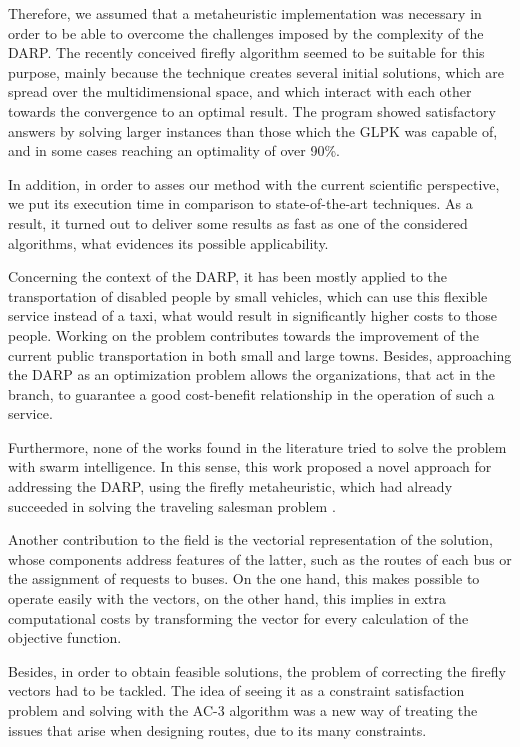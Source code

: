 \documentclass[tuberlin,cic,tc,openright,english,noabntcite,oneside]{iiufrgs}
\begin{document}
Therefore, we assumed that a metaheuristic implementation was necessary in order to be able to overcome the challenges imposed by the complexity of the DARP. The recently conceived firefly algorithm seemed to be suitable for this purpose, mainly because the technique creates several initial solutions, which are spread over the multidimensional space, and which interact with each other towards the convergence to an optimal result. The program showed satisfactory answers by solving larger instances than those which the GLPK was capable of, and in some cases reaching an optimality of over 90\%.

In addition, in order to asses our method with the current scientific perspective, we put its execution time in comparison to state-of-the-art techniques. As a result, it turned out to deliver some results as fast as one of the considered algorithms, what evidences its possible applicability.

Concerning the context of the DARP, it has been mostly applied to the transportation of disabled people by small vehicles, which can use this flexible service instead of a taxi, what would result in significantly higher costs to those people. Working on the problem contributes towards the improvement of the current public transportation in both small and large towns. Besides, approaching the DARP as an optimization problem allows the organizations, that act in the branch, to guarantee a good cost-benefit relationship in the operation of such a service.

Furthermore, none of the works found in the literature tried to solve the problem with swarm intelligence. In this sense, this work proposed a novel approach for addressing the DARP, using the firefly metaheuristic, which had already succeeded in solving the traveling salesman problem \parencite{jati_evolutionary_2011}.

Another contribution to the field is the vectorial representation of the solution, whose components address features of the latter, such as the routes of each bus or the assignment of requests to buses. On the one hand, this makes possible to operate easily with the vectors, on the other hand, this implies in extra computational costs by transforming the vector for every calculation of the objective function.

Besides, in order to obtain feasible solutions, the problem of correcting the firefly vectors had to be tackled. The idea of seeing it as a constraint satisfaction problem and solving with the AC-3 algorithm was a new way of treating the issues that arise when designing routes, due to its many constraints.
\end{document}
